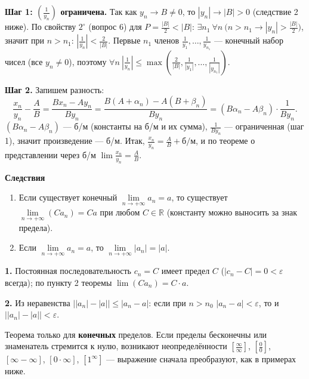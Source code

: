 \documentclass[a4paper,11pt]{article}
\newcommand{\R}{\mathbb{R}}
\newcommand{\eps}{\varepsilon}
\newcommand{\podr}[1]{\par\needspace{8\baselineskip}\medskip
  {\large\bfseries\textcolor{oprc!80!black}{#1}}\par\nopagebreak\smallskip}
\begin{document}
\begin{dop}
\textbf{Шаг 1: $\left(\frac{1}{y_n}\right)$ ограничена.} Так как $y_n \to B \ne 0$, то $|y_n| \to |B| > 0$ (следствие 2 ниже).
По свойству $2^\circ$ (вопрос 6) для $P = \frac{|B|}{2} < |B|$: $\exists n_1\ \forall n\ \bigl(n > n_1 \to |y_n| > \frac{|B|}{2}\bigr)$,
значит при $n > n_1$: $\left|\frac{1}{y_n}\right| < \frac{2}{|B|}$. Первые $n_1$ членов $\frac{1}{y_1}, \dots, \frac{1}{y_{n_1}}$ --- конечный набор
чисел (все $y_n \ne 0$), поэтому
$\forall n\ \left|\frac1{y_n}\right| \le \max\left(\frac2{|B|}, \frac1{|y_1|}, \dots, \frac1{|y_{n_1}|}\right)$.

\textbf{Шаг 2.} Запишем разность:
\[
  \frac{x_n}{y_n} - \frac{A}{B} = \frac{B x_n - A y_n}{B y_n}
  = \frac{B(A + \alpha_n) - A(B + \beta_n)}{B y_n}
  = (B\alpha_n - A\beta_n) \cdot \frac{1}{B y_n}.
\]
$(B\alpha_n - A\beta_n)$ --- б/м (константы на б/м и их сумма), $\frac{1}{B y_n}$ --- ограниченная (шаг 1),
значит произведение --- б/м. Итак, $\frac{x_n}{y_n} = \frac{A}{B} + \text{б/м}$, и по теореме о представлении через б/м
$\lim \frac{x_n}{y_n} = \frac{A}{B}$.
\end{dop}

\podr{Следствия}

\begin{enumerate}[leftmargin=*]
  \item Если существует конечный $\lim\limits_{n \to +\infty} a_n = a$, то существует $\lim\limits_{n \to +\infty} (C a_n) = Ca$ при любом $C \in \R$
        (константу можно выносить за знак предела).
  \item Если $\lim\limits_{n \to +\infty} a_n = a$, то $\lim\limits_{n \to +\infty} |a_n| = |a|$.
\end{enumerate}

\begin{dop}
\textbf{1.} Постоянная последовательность $c_n = C$ имеет предел $C$ ($|c_n - C| = 0 < \eps$ всегда); по пункту 2 теоремы
$\lim (C a_n) = C \cdot a$.

\textbf{2.} Из неравенства $\bigl||a_n| - |a|\bigr| \le |a_n - a|$: если при $n > n_0$ $|a_n - a| < \eps$, то и $\bigl||a_n| - |a|\bigr| < \eps$.
\end{dop}

\begin{dop}
Теорема только для \textbf{конечных} пределов. Если пределы бесконечны или знаменатель стремится к нулю, возникают
неопределённости $\left[\frac{\infty}{\infty}\right]$, $\left[\frac00\right]$, $[\infty - \infty]$, $[0 \cdot \infty]$, $[1^\infty]$ ---
выражение сначала преобразуют, как в примерах ниже.
\end{dop}
\end{document}
